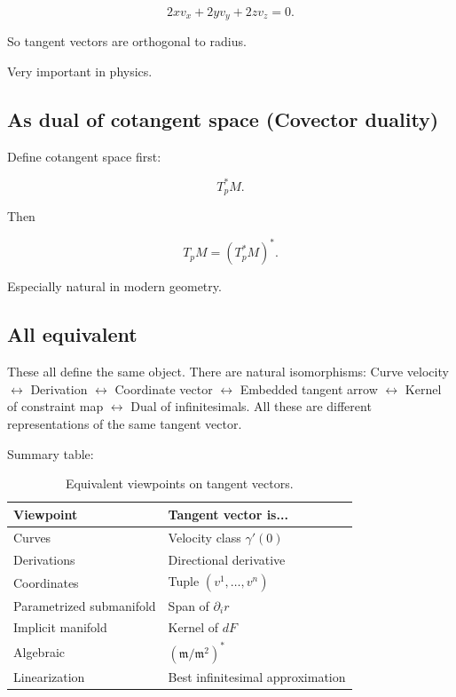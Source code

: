 \documentclass[aps,prl,twocolumn,groupedaddress]{revtex4-2}
\begin{document}
$$
2xv_x+2yv_y+2zv_z=0.
$$

So tangent vectors are orthogonal to radius.

Very important in physics.

\subsection{As dual of cotangent space (Covector duality)}

Define cotangent space first:

$$
T_p^*M.
$$

Then

$$
T_pM=(T_p^*M)^*.
$$

Especially natural in modern geometry.

\subsection{All equivalent}

These all define the same object.
There are natural isomorphisms:
Curve velocity
$
\longleftrightarrow
$
Derivation
$
\longleftrightarrow
$
Coordinate vector
$
\longleftrightarrow
$
Embedded tangent arrow
$
\longleftrightarrow
$
Kernel of constraint map
$
\longleftrightarrow
$
Dual of infinitesimals.
All these are different representations of the same tangent vector.

Summary table:


\begin{table}[h]
\centering
\begin{tabular}{|l|l|}
\hline
\textbf{Viewpoint} & \textbf{Tangent vector is...} \\
\hline
Curves & Velocity class $\gamma'(0)$ \\
Derivations & Directional derivative \\
Coordinates & Tuple $(v^1,\dots,v^n)$ \\
Parametrized submanifold & Span of $\partial_i r$ \\
Implicit manifold & Kernel of $dF$ \\
Algebraic & $(\mathfrak m/\mathfrak m^2)^*$ \\
Linearization & Best infinitesimal approximation \\
\hline
\end{tabular}
\caption{Equivalent viewpoints on tangent vectors.}
\end{table}
\end{document}
